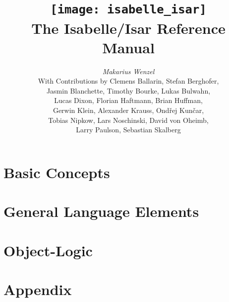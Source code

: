 \documentclass[12pt,a4paper,fleqn]{report}
\title{\texttt{[image: isabelle\_isar]} \\[4ex] The Isabelle/Isar Reference Manual}
\author{\emph{Makarius Wenzel} \\[3ex]
  With Contributions by
  Clemens Ballarin,
  Stefan Berghofer, \\
  Jasmin Blanchette,
  Timothy Bourke,
  Lukas Bulwahn, \\
  Lucas Dixon,
  Florian Haftmann,
  Brian Huffman, \\
  Gerwin Klein,
  Alexander Krauss,
  Ond\v{r}ej Kun\v{c}ar, \\
  Tobias Nipkow,
  Lars Noschinski,
  David von Oheimb, \\
  Larry Paulson,
  Sebastian Skalberg
}
\let\intorig=\int  %
\begin{document}
\maketitle 

{\def\isamarkupchapter#1{\chapter*{#1}}}
\tableofcontents
\clearfirst

\part{Basic Concepts}



\part{General Language Elements}







\part{Object-Logic}


\part{Appendix}
\appendix

\let\int\intorig



\begingroup
  \tocentry{\bibname}
   \small\raggedright\frenchspacing
  
\endgroup

\tocentry{\indexname}
\printindex
\end{document}
